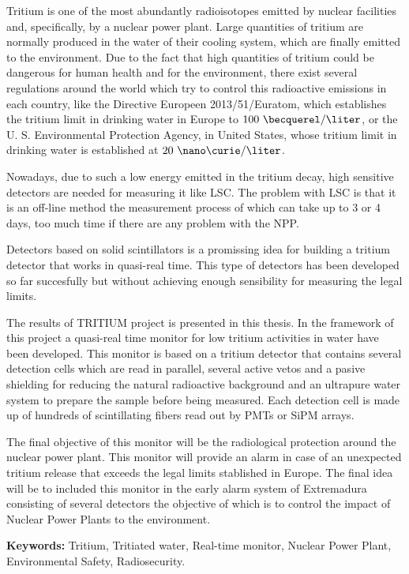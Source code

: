 Tritium is one of the most abundantly radioisotopes emitted by nuclear facilities and, specifically, by a nuclear power plant. Large quantities of tritium are normally produced in the water of their cooling system, which are finally emitted to the environment. Due to the fact that high quantities of tritium could be dangerous for human health and for the environment, there exist several regulations around the world which try to control this radioactive emissions in each country, like the Directive Europeen 2013/51/Euratom, which establishes the tritium limit in drinking water in Europe to $100~\becquerel/\liter$, or the U. S. Environmental Protection Agency, in United States, whose tritium limit in drinking water is established at $20~\nano\curie/\liter$.

Nowadays, due to such a low energy emitted in the tritium decay, high sensitive detectors are needed for measuring it like LSC. The problem with LSC is that it is an off-line method the measurement process of which can take up to 3 or 4 days, too much time if there are any problem with the NPP.

Detectors based on solid scintillators is a promissing idea for building a tritium detector that works in quasi-real time. This type of detectors has been developed so far succesfully but without achieving enough sensibility for measuring the legal limits.

The results of TRITIUM project is presented in this thesis. In the framework of this project a quasi-real time monitor for low tritium activities in water have been developed. This monitor is based on a tritium detector that contains several detection cells which are read in parallel, several active vetos and a pasive shielding for reducing the natural radioactive background and an ultrapure water system to prepare the sample before being measured. Each detection cell is made up of hundreds of scintillating fibers read out by PMTs or SiPM arrays.

The final objective of this monitor will be the radiological protection around the nuclear power plant. This monitor will provide an alarm in case of an unexpected tritium release that exceeds the legal limits stablished in Europe. The final idea will be to included this monitor in the early alarm system of Extremadura consisting of several detectors the objective of which is to control the impact of Nuclear Power Plants to the environment.

\vspace{1cm}

\textbf{Keywords:} Tritium, Tritiated water, Real-time monitor, Nuclear Power Plant, Environmental Safety, Radiosecurity.